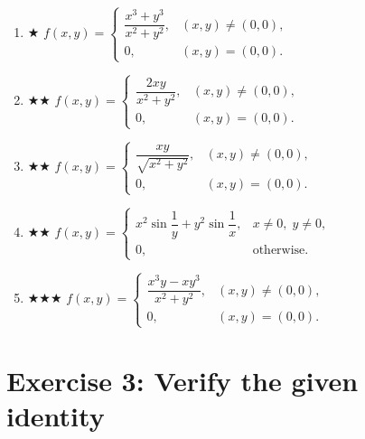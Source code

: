 \documentclass[12pt,a4paper]{article}
\newcommand{\easy}{{\color{green!60!black}$\bigstar$}}
\newcommand{\medium}{{\color{orange}$\bigstar\bigstar$}}
\newcommand{\hard}{{\color{red}$\bigstar\bigstar\bigstar$}}
\begin{document}
\begin{enumerate}[leftmargin=*, label=(\alph*)]

\item \easy\quad
$f(x,y)=\begin{cases}
\dfrac{x^3+y^3}{x^2+y^2}, & (x,y)\ne(0,0),\\[6pt]
0, & (x,y)=(0,0).
\end{cases}$

\item \medium\quad
$f(x,y)=\begin{cases}
\dfrac{2xy}{x^2+y^2}, & (x,y)\ne(0,0),\\[6pt]
0, & (x,y)=(0,0).
\end{cases}$

\item \medium\quad
$f(x,y)=\begin{cases}
\dfrac{xy}{\sqrt{x^2+y^2}}, & (x,y)\ne(0,0),\\[6pt]
0, & (x,y)=(0,0).
\end{cases}$

\item \medium\quad
$f(x,y)=\begin{cases}
x^2\sin\!\dfrac{1}{y}+y^2\sin\!\dfrac{1}{x}, & x\ne 0,\; y\ne 0,\\[4pt]
0, & \text{otherwise}.
\end{cases}$

\item \hard\quad
$f(x,y)=\begin{cases}
\dfrac{x^3 y - xy^3}{x^2+y^2}, & (x,y)\ne(0,0),\\[6pt]
0, & (x,y)=(0,0).
\end{cases}$

\end{enumerate}

\section*{Exercise 3: Verify the given identity}
\end{document}
